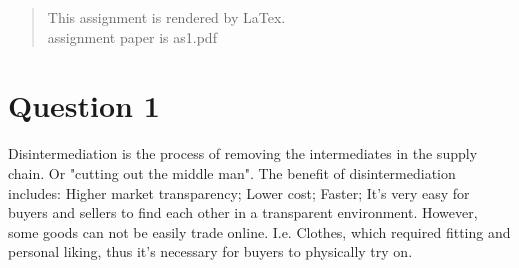 \documentclass[12pt]{article}
\begin{document}
\maketitle

\begin{abstract}
  This assignment is rendered by LaTex.\\
  assignment paper is as1.pdf
\end{abstract}

\clearpage

\section{Question 1}
Disintermediation is the process of removing the intermediates in the supply chain. Or "cutting out the middle man". The benefit of disintermediation includes:
Higher market transparency;
Lower cost;
Faster;
It's very easy for buyers and sellers to find each other in a transparent environment. However, some goods can not be easily trade online. I.e. Clothes, which required fitting and personal liking, thus it's necessary for buyers to physically try on.
\end{document}
